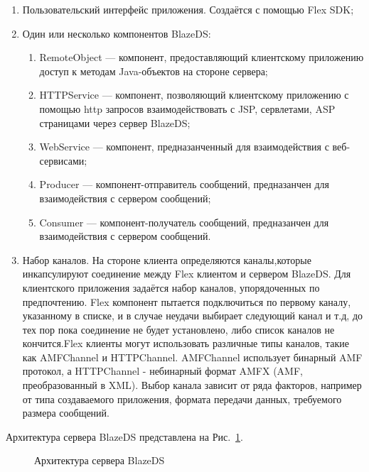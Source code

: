 \begin{enumerate}
\item Пользовательский интерфейс приложения. Создаётся с помощью Flex SDK;
\item Один или несколько компонентов BlazeDS: 
\begin{enumerate}
\item RemoteObject --- компонент, предоставляющий клиентскому приложению доступ к методам Java-объектов на стороне сервера; 
\item HTTPService --- компонент, позволяющий клиентскому приложению с помощью http запросов взаимодействовать с JSP, сервлетами, 
ASP страницами через сервер BlazeDS;
\item WebService --- компонент, предназанченный для взаимодействия с веб-сервисами;
\item Producer --- компонент-отправитель сообщений, предназанчен для взаимодействия с сервером сообщений;
\item Consumer --- компонент-получатель сообщений, предназанчен для взаимодействия с сервером сообщений.
\end{enumerate}
\item Набор каналов. На стороне клиента определяются каналы,которые инкапсулируют соединение между Flex клиентом и сервером 
BlazeDS. Для клиентского приложения задаётся набор каналов, упорядоченных по предпочтению. Flex компонент пытается подключиться 
по первому каналу, указанному в списке, и в случае неудачи выбирает следующий канал и т.д, до тех пор пока соединение не будет 
установлено, либо список каналов не кончится.Flex клиенты могут использовать различные типы каналов, такие как AMFChannel и 
HTTPChannel. AMFChannel использует бинарный AMF протокол, а HTTPChannel - небинарный формат AMFX (AMF, преобразованный в XML). 
Выбор канала зависит от ряда факторов, например от типа создаваемого приложения, формата передачи данных, требуемого размера 
сообщений.
\end{enumerate}

Архитектура сервера BlazeDS представлена на Рис.~\ref{ris:blazeDSServer.png}.

\begin{figure}[ht]
\caption{Архитектура сервера BlazeDS}
\label{ris:blazeDSServer.png}
\end{figure}

